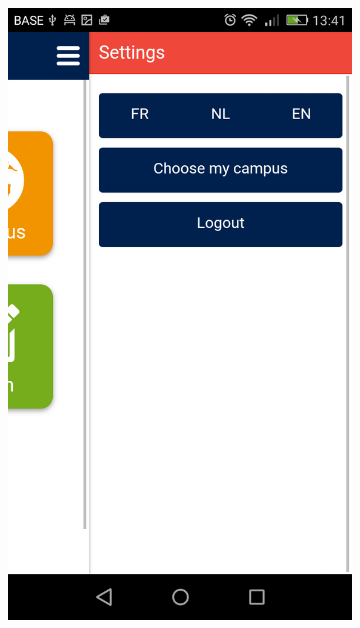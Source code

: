 \documentclass{eplmastersthesis}
\begin{document}
\begin{figure}[H]
    \begin{subfigure}[b]{0.3\textwidth}
        \includegraphics[width=\textwidth]{Images/Application_screens/Screenshot_2016-06-06-13-41-05.png}
    \end{subfigure}
\end{figure}
\end{document}
